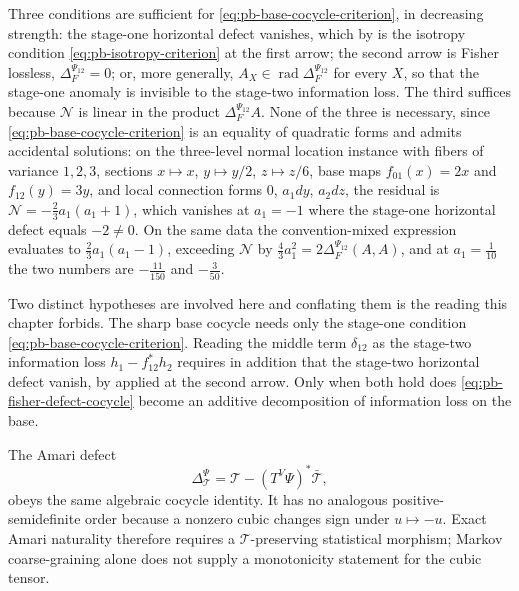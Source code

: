 Three conditions are sufficient for
\eqref{eq:pb-base-cocycle-criterion}, in decreasing strength: the stage-one
horizontal defect vanishes, which by  is the
isotropy condition \eqref{eq:pb-isotropy-criterion} at the first arrow; the
second arrow is Fisher lossless, $\Delta_F^{\Psi_{12}}=0$; or, more generally,
$A_X\in\operatorname{rad}\Delta_F^{\Psi_{12}}$ for every $X$, so that the
stage-one anomaly is invisible to the stage-two information loss.  The third
suffices because $\mathcal N$ is linear in the product
$\Delta_F^{\Psi_{12}}A$.  None of the three is necessary, since
\eqref{eq:pb-base-cocycle-criterion} is an equality of quadratic forms and admits
accidental solutions: on the three-level normal location instance with fibers
of variance $1,2,3$, sections $x\mapsto x$, $y\mapsto y/2$, $z\mapsto z/6$,
base maps $f_{01}(x)=2x$ and $f_{12}(y)=3y$, and local connection forms $0$,
$a_1dy$, $a_2dz$, the residual is
$\mathcal N=-\tfrac23a_1(a_1+1)$, which vanishes at $a_1=-1$ where the
stage-one horizontal defect equals $-2\ne0$.  On the same data the
convention-mixed expression evaluates to $\tfrac23a_1(a_1-1)$, exceeding
$\mathcal N$ by $\tfrac43a_1^2=2\Delta_F^{\Psi_{12}}(A,A)$, and at
$a_1=\tfrac1{10}$ the two numbers are $-\tfrac{11}{150}$ and $-\tfrac3{50}$.

Two distinct hypotheses are involved here and conflating them is the reading
this chapter forbids.  The sharp base cocycle needs only the stage-one
condition \eqref{eq:pb-base-cocycle-criterion}.  Reading the middle term
$\delta_{12}$ as the stage-two information loss $h_1-f_{12}^*h_2$ requires in
addition that the stage-two horizontal defect vanish, by
 applied at the second arrow.  Only when
both hold does \eqref{eq:pb-fisher-defect-cocycle} become an additive
decomposition of information loss on the base.  

The Amari defect
\begin{equation}
\Delta_{\mathcal T}^\Psi
=\mathcal T-(T^V\Psi)^*\bar{\mathcal T},
\label{eq:pb-amari-defect}
\end{equation}
obeys the same algebraic cocycle identity.  It has no analogous
positive-semidefinite order because a nonzero cubic changes sign under
$u\mapsto-u$.  Exact Amari naturality therefore requires a
$\mathcal T$-preserving statistical morphism; Markov coarse-graining alone
does not supply a monotonicity statement for the cubic tensor.

